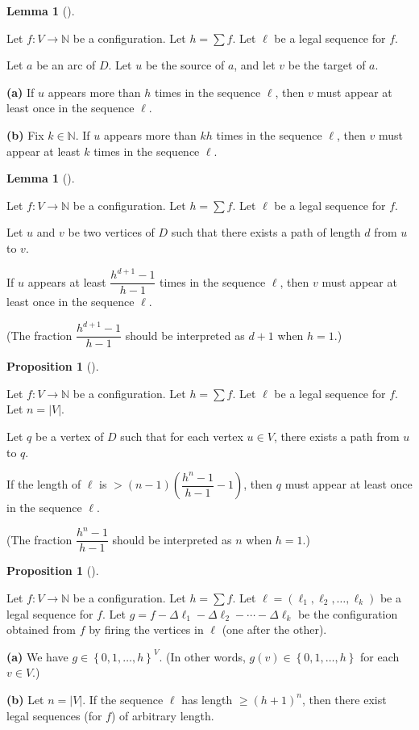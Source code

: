 \documentclass[numbers=enddot,12pt,final,onecolumn,notitlepage]{scrartcl}%
\theoremstyle{definition}
\newtheorem{lem}[theo]{Lemma}
\newenvironment{lemma}[1][]
{\begin{lem}[#1]\begin{leftbar}}
{\end{leftbar}\end{lem}}
\newtheorem{prop}[theo]{Proposition}
\newenvironment{proposition}[1][]
{\begin{prop}[#1]\begin{leftbar}}
{\end{leftbar}\end{prop}}
\let\sumnonlimits\sum
\renewcommand{\sum}{\sumnonlimits\limits}
\newcommand{\NN}{\mathbb{N}}
\newcommand{\set}[1]{\left\{ #1 \right\}}
\newcommand{\abs}[1]{\left| #1 \right|}
\newcommand{\tup}[1]{\left( #1 \right)}
\begin{document}
\begin{lemma} \label{lem.chip.leg-bound1}
Let $f : V \to \NN$ be a configuration.
Let $h = \sum f$.
Let $\ell$ be a legal sequence for $f$.

Let $a$ be an arc of $D$.
Let $u$ be the source of $a$, and let $v$ be the target of $a$.

\textbf{(a)}
If $u$ appears more than $h$ times in the sequence $\ell$,
then $v$ must appear at least once in the sequence $\ell$.

\textbf{(b)}
Fix $k \in \NN$.
If $u$ appears more than $kh$ times in the sequence $\ell$,
then $v$ must appear at least $k$ times in the sequence $\ell$.
\end{lemma}

\begin{lemma} \label{lem.chip.leg-bound1b}
Let $f : V \to \NN$ be a configuration.
Let $h = \sum f$.
Let $\ell$ be a legal sequence for $f$.

Let $u$ and $v$ be two vertices of $D$ such that there exists
a path of length $d$ from $u$ to $v$.

If $u$ appears at least $\dfrac{h^{d+1}-1}{h-1}$
times in the sequence $\ell$,
then $v$ must appear at least once in the sequence $\ell$.

(The fraction $\dfrac{h^{d+1}-1}{h-1}$ should be interpreted
as $d+1$ when $h = 1$.)
\end{lemma}

\begin{proposition} \label{prop.chip.leg-everyone-fires}
Let $f : V \to \NN$ be a configuration.
Let $h = \sum f$.
Let $\ell$ be a legal sequence for $f$.
Let $n = \abs{V}$.

Let $q$ be a vertex of $D$ such that for each vertex
$u \in V$, there exists a path from $u$ to $q$.

If the length of $\ell$ is
$> \tup{n-1} \tup{ \dfrac{h^n-1}{h-1} - 1 }$,
then $q$ must appear at least once in the sequence $\ell$.

(The fraction $\dfrac{h^n-1}{h-1}$ should be interpreted
as $n$ when $h = 1$.)
\end{proposition}

\begin{proposition} \label{prop.chip.leg-period}
Let $f : V \to \NN$ be a configuration.
Let $h = \sum f$.
Let $\ell = \tup{\ell_1, \ell_2, \ldots, \ell_k}$ be a
legal sequence for $f$.
Let
$g = f - \Delta \ell_1 - \Delta \ell_2 - \cdots - \Delta \ell_k$
be the configuration obtained from $f$ by firing the vertices in
$\ell$ (one after the other).

\textbf{(a)} We have $g \in \set{0, 1, \ldots, h}^V$.
(In other words, $g \tup{v} \in \set{0, 1, \ldots, h}$
for each $v \in V$.)

\textbf{(b)} Let $n = \abs{V}$.
If the sequence $\ell$ has length
$\geq \tup{h+1}^n$, then there exist legal sequences (for $f$)
of arbitrary length.
\end{proposition}
\end{document}
